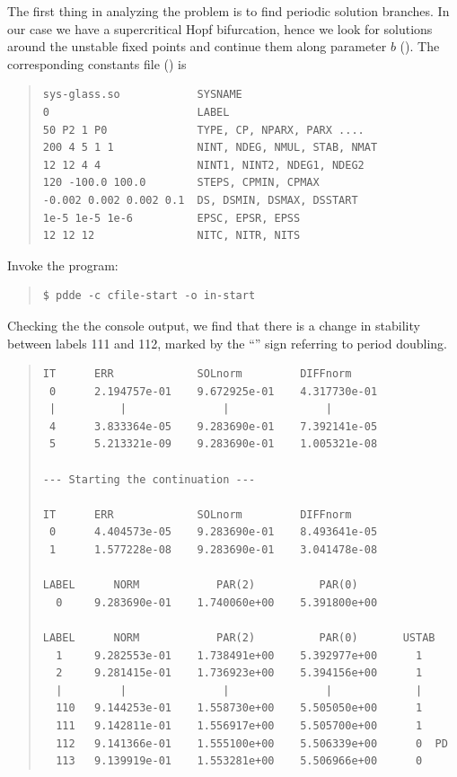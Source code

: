 \documentclass[10pt,a4paper]{ddedoc}
\begin{document}
The first thing in analyzing the problem is to find periodic solution
branches. In our case we have a supercritical Hopf bifurcation, hence we look
for solutions around the unstable fixed points and continue them along
parameter $b$ (). The corresponding constants file
() is
{ \small \begin{quote} \begin{lstlisting}[basicstyle=\tt,frame=single]
sys-glass.so            SYSNAME
0                       LABEL
50 P2 1 P0              TYPE, CP, NPARX, PARX ....
200 4 5 1 1             NINT, NDEG, NMUL, STAB, NMAT
12 12 4 4               NINT1, NINT2, NDEG1, NDEG2
120 -100.0 100.0        STEPS, CPMIN, CPMAX
-0.002 0.002 0.002 0.1  DS, DSMIN, DSMAX, DSSTART
1e-5 1e-5 1e-6          EPSC, EPSR, EPSS
12 12 12                NITC, NITR, NITS
\end{lstlisting} \end{quote} } \noindent
Invoke the program:
{ \small \begin{quote} \begin{lstlisting}[basicstyle=\tt,frame=single]
$ pdde -c cfile-start -o in-start
\end{lstlisting} \end{quote} } \noindent
Checking the the console output, we find that there is a change in
stability between labels 111 and 112, marked by the ``'' sign referring
to period doubling.
{ \small \begin{quote} \begin{lstlisting}[basicstyle=\tt,frame=single]
IT      ERR             SOLnorm         DIFFnorm
 0      2.194757e-01    9.672925e-01    4.317730e-01
 |          |               |               |
 4      3.833364e-05    9.283690e-01    7.392141e-05
 5      5.213321e-09    9.283690e-01    1.005321e-08

--- Starting the continuation ---

IT      ERR             SOLnorm         DIFFnorm
 0      4.404573e-05    9.283690e-01    8.493641e-05
 1      1.577228e-08    9.283690e-01    3.041478e-08

LABEL      NORM            PAR(2)          PAR(0)
  0     9.283690e-01    1.740060e+00    5.391800e+00

LABEL      NORM            PAR(2)          PAR(0)       USTAB
  1     9.282553e-01    1.738491e+00    5.392977e+00      1
  2     9.281415e-01    1.736923e+00    5.394156e+00      1
  |         |               |               |             |
  110   9.144253e-01    1.558730e+00    5.505050e+00      1
  111   9.142811e-01    1.556917e+00    5.505700e+00      1
  112   9.141366e-01    1.555100e+00    5.506339e+00      0  PD
  113   9.139919e-01    1.553281e+00    5.506966e+00      0
\end{lstlisting} \end{quote} } \noindent
\end{document}
